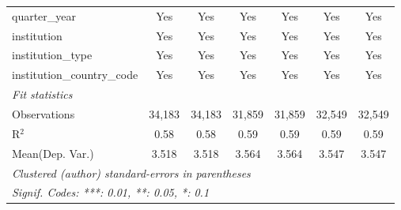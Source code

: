 \begin{tabular}{lcccccc}
   quarter\_year                      & Yes     & Yes     & Yes     & Yes      & Yes     & Yes\\  
   institution                        & Yes     & Yes     & Yes     & Yes      & Yes     & Yes\\  
   institution\_type                  & Yes     & Yes     & Yes     & Yes      & Yes     & Yes\\  
   institution\_country\_code         & Yes     & Yes     & Yes     & Yes      & Yes     & Yes\\  
   \midrule
   \emph{Fit statistics}\\
   Observations                       & 34,183  & 34,183  & 31,859  & 31,859   & 32,549  & 32,549\\  
   R$^2$                              & 0.58    & 0.58    & 0.59    & 0.59     & 0.59    & 0.59\\  
Mean(Dep. Var.) & 3.518 & 3.518 & 3.564 & 3.564 & 3.547 & 3.547 \\
   \midrule \midrule
   \multicolumn{7}{l}{\emph{Clustered (author) standard-errors in parentheses}}\\
   \multicolumn{7}{l}{\emph{Signif. Codes: ***: 0.01, **: 0.05, *: 0.1}}\\
\end{tabular}
\par\endgroup
